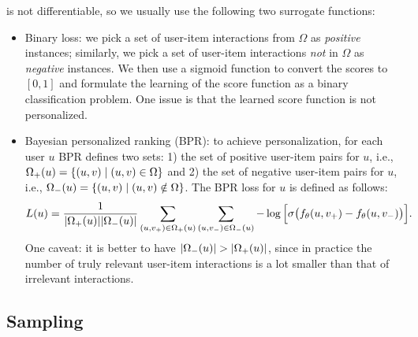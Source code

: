             
        \RecallAtK is not differentiable, so we usually use the following two surrogate functions:
            \begin{itemize}
                \item Binary loss: we pick a set of user-item interactions from $\Omega$ as \emph{positive} instances; similarly, we pick a set of user-item interactions \emph{not} in $\Omega$ as \emph{negative} instances. 
                We then use a sigmoid function to convert the scores to $[0, 1]$ and formulate the learning of the score function as a binary classification problem.
                One issue is that the learned score function is not personalized.
                \item Bayesian personalized ranking (BPR): to achieve personalization,  for each user $u$ BPR defines two sets: 1) the set of positive user-item pairs for $u$, i.e., $\Omega_+(u)=\{ (u, v) \mid (u, v) \in \Omega \}$ and 2) the set of negative user-item pairs for $u$, i.e., $\Omega_-(u)=\{ (u, v) \mid (u, v) \notin \Omega \}$.
                The BPR loss for $u$ is defined as follows:
                    \begin{equation}
                        L(u) = \frac{1}{| \Omega_+(u) | | \Omega_-(u) |} \sum_{(u, v_+) \in \Omega_+(u) }^{}{
                            \sum_{(u, v_-) \in \Omega_-(u)}^{}{
                                -\log \Big[ \sigma\big(f_\theta(u, v_+) - f_\theta(u, v_-) \big) \Big]
                            }
                        }.
                    \end{equation}
                One caveat: it is better to have $| \Omega_-(u) | > | \Omega_+(u) |$, since in practice the number of truly relevant user-item interactions is a lot smaller than that of irrelevant interactions.
            \end{itemize}

    \subsection{Sampling}
        
            
    
        
        
        
        
    